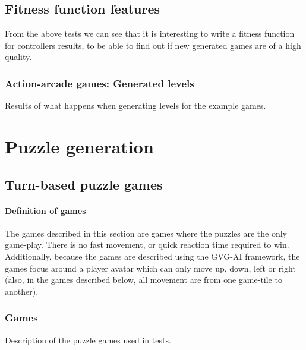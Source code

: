 \documentclass[a4paper,titlepage,final, twoside]{report}
\begin{document}
\section{Fitness function features}
From the above tests we can see that it is interesting to write a fitness function for controllers results, to be able to find out if new generated games are of a high quality.


\subsection{Action-arcade games: Generated levels}
Results of what happens when generating levels for the example games.



\chapter{Puzzle generation}
\label{ch_puzzles}

\section{Turn-based puzzle games}

\subsubsection*{Definition of games}
The games described in this section are games where the puzzles are the only game-play. There is no fast movement, or quick reaction time required to win. Additionally, because the games are described using the GVG-AI framework, the games focus around a player avatar which can only move up, down, left or right (also, in the games described below, all movement are from one game-tile to another).

\subsection{Games} 
Description of the puzzle games used in tests. 
\end{document}
